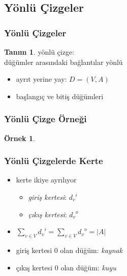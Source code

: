 \documentclass[dvipsnames]{beamer}
\theoremstyle{definition}
\newtheorem{tanim}[theorem]{Tanım}
\theoremstyle{example}
\newtheorem{ornek}[theorem]{Örnek}
\theoremstyle{plain}
\begin{document}
\subsection{Yönlü Çizgeler}

\begin{frame}
  \frametitle{Yönlü Çizgeler}

  \begin{tanim}
    \alert{yönlü çizge}:\\
    düğümler arasındaki bağlantılar yönlü

    \pause
    \begin{itemize}
      \item ayrıt yerine \alert{yay}: $D=(V,A)$
      \item \alert{başlangıç} ve \alert{bitiş} düğümleri
    \end{itemize}
  \end{tanim}
\end{frame}

\begin{frame}
  \frametitle{Yönlü Çizge Örneği}

  \begin{ornek}
    \begin{center}
    \end{center}
  \end{ornek}
\end{frame}

\begin{frame}
  \frametitle{Yönlü Çizgelerde Kerte}

  \begin{itemize}
    \item kerte ikiye ayrılıyor
    \begin{itemize}
      \item \emph{giriş kertesi}: ${d_v}^i$
      \item \emph{çıkış kertesi}: ${d_v}^o$
    \end{itemize}

    \pause
    \item $\sum_{v \in V} {d_v}^i = \sum_{v \in V} {d_v}^o = |A|$

    \pause
    \medskip
    \item giriş kertesi 0 olan düğüm: \emph{kaynak}
    \item çıkış kertesi 0 olan düğüm: \emph{kuyu}
  \end{itemize}
\end{frame}
\end{document}
